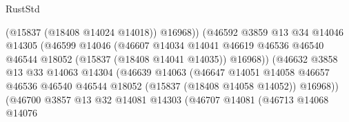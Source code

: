 \begin{lexlean}{RustStd}
\begin{coremodule}
{\begin{coremodule}
{{{{{{{{{{{{{{{{{{{{{{{{{{{{{{{{{{{{{{{{{{{{{{{{{{{{{{{{{{{{                                            (@15837 (@18408 @14024 @14018))
                                            @16968))
                                        (@46592
                                          @3859
                                          @13
                                          @34
                                          @14046
                                          @14305
                                          (@46599
                                            @14046
                                            (@46607
                                              @14034
                                              @14041
                                              @46619
                                              @46536
                                              @46540
                                              @46544
                                              @18052
                                              (@15837 (@18408 @14041 @14035))
                                              @16968))
                                          (@46632
                                            @3858
                                            @13
                                            @33
                                            @14063
                                            @14304
                                            (@46639
                                              @14063
                                              (@46647
                                                @14051
                                                @14058
                                                @46657
                                                @46536
                                                @46540
                                                @46544
                                                @18052
                                                (@15837 (@18408 @14058 @14052))
                                                @16968))
                                            (@46700
                                              @3857
                                              @13
                                              @32
                                              @14081
                                              @14303
                                              (@46707
                                                @14081
                                                (@46713
                                                  @14068
                                                  @14076
}}}}}}}}}}}}}}}}}}}}}}}}}}}}}}}}}}}}}}}}}}}}}}}}}}}}}}}}}}}}
\end{coremodule}}
\end{coremodule}
\end{lexlean}
